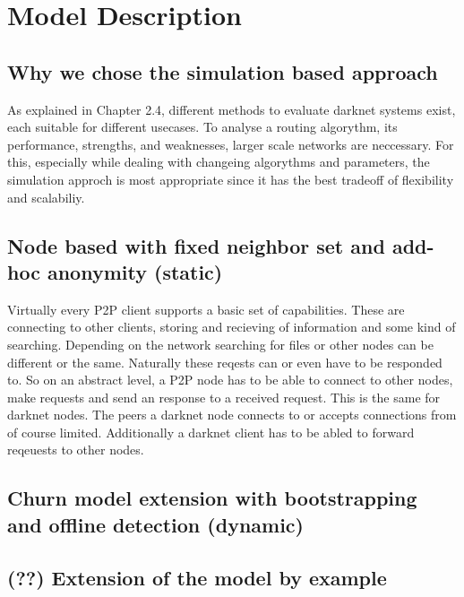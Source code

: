 \chapter{Model Description}

\section{Why we chose the simulation based approach}

As explained in Chapter 2.4, different methods to evaluate darknet systems exist, each suitable for different usecases. To analyse a routing algorythm, its performance, strengths, and weaknesses, larger scale networks are neccessary. For this, especially while dealing with changeing algorythms and parameters, the simulation approch is most appropriate since it has the best tradeoff of flexibility and scalabiliy.

\section{Node based with fixed neighbor set and add-hoc anonymity (static)}

Virtually every P2P client supports a basic set of capabilities. These are connecting to other clients, storing and recieving of information and some kind of searching. Depending on the network searching for files or other nodes can be different or the same. Naturally these reqests can or even have to be responded to.
So on an abstract level, a P2P node has to be able to connect to other nodes, make requests and send an response to a received request. This is the same for darknet nodes. The peers a darknet node connects to or accepts connections from of course limited. Additionally a darknet client has to be abled to forward reqeuests to other nodes.

\section{Churn model extension with bootstrapping and offline detection (dynamic)}
\section{(??) Extension of the model by example}
